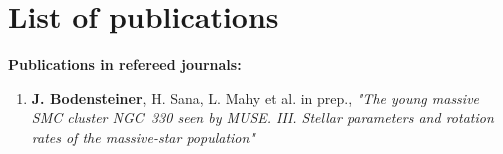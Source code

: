 \chapter{List of publications}\label{ch:publications}

\begin{large}
\textbf{Publications in refereed journals:}
\end{large}

\begin{enumerate}

\item \textbf{J. Bodensteiner}, H. Sana, L. Mahy et al. in prep., \textit{"The young massive SMC cluster NGC~330 seen by MUSE. III. Stellar parameters and rotation rates of the massive-star population"}


\end{enumerate}



\cleardoublepage

